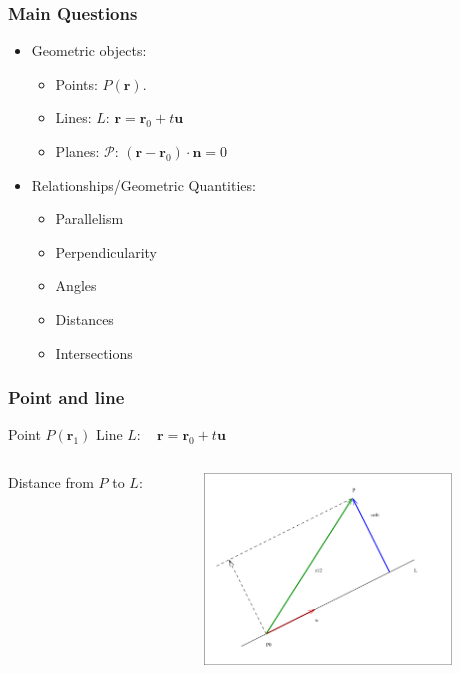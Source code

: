 \begin{frame}
 \frametitle{Main Questions}

\begin{itemize}
  \item Geometric objects:
  \begin{itemize}
    \item Points: $P(\textbf{r})$.
    \item Lines: $L$: $\textbf{r}= \textbf{r}_0 + t\textbf{u}$
    \item Planes: $\mathcal{P}$: $(\textbf{r}-\textbf{r}_0)\cdot \textbf{n} =0$
  \end{itemize}

  \item Relationships/Geometric Quantities:
  \begin{itemize}
      \item Parallelism
      \item Perpendicularity
      \item Angles
      \item Distances
      \item Intersections
  \end{itemize}
\end{itemize}
\end{frame}

\begin{frame}
  \frametitle{Point and line}
  Point $P(\textbf{r}_1)$ \hspace{2cm} Line $L: \quad \textbf{r}=\textbf{r}_0+t\textbf{u}$

  \begin{columns}
  \column{6cm}
  \textcolor[rgb]{0.98,0.00,0.00}{Distance} from $P$ to $L$:
  \column{6.5cm}
      \begin{figure}
        \includegraphics[height=2in]{../images/ok-distance_point_line.eps}
    \end{figure}
    \end{columns}
\end{frame}

